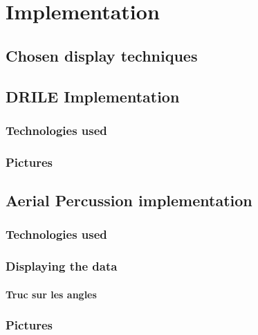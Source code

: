 \section{Implementation}
\subsection{Chosen display techniques}
\subsection{DRILE Implementation}
\subsubsection{Technologies used}
\subsubsection{Pictures}
\subsection{Aerial Percussion implementation}
\subsubsection{Technologies used}
\subsubsection{Displaying the data}
\paragraph{Truc sur les angles}
\subsubsection{Pictures}